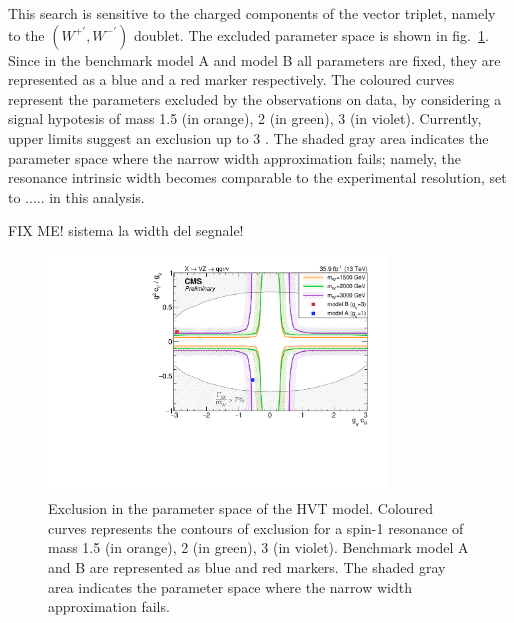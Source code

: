 \noindent This search is sensitive to the charged components of the vector triplet, namely to the $(W^{+'}, W^{-'})$ doublet. The excluded parameter space is shown in fig.~\ref{fig:interpretation}. Since in the benchmark model A and model B all parameters are fixed, they are represented as a blue and a red marker respectively. The coloured curves represent the parameters excluded by the observations on data, by considering a signal hypotesis of mass 1.5 \TeV (in orange), 2 \TeV (in green), 3 \TeV (in violet). Currently, upper limits suggest an exclusion up to 3 \TeV. The shaded gray area indicates the parameter space where the narrow width approximation fails; namely, the resonance intrinsic width becomes comparable to the experimental resolution, set to ..... in this analysis.

{\color{red} FIX ME! sistema la width del segnale!}

\begin{figure}[!h]
 \begin{center}
   \includegraphics[width=0.8\textwidth]{v9/plotsAlpha/Limits/HVT_XVZ_Wprime.pdf}
   \caption{Exclusion in the parameter space of the HVT model. Coloured curves represents the contours of exclusion for a spin-1 \Wp resonance of mass 1.5 \TeV (in orange), 2 \TeV (in green), 3 \TeV (in violet). Benchmark model A and B are represented as blue and red markers. The shaded gray area indicates the parameter space where the narrow width approximation fails.}
   \label{fig:interpretation}
 \end{center}
\end{figure}

\clearpage

